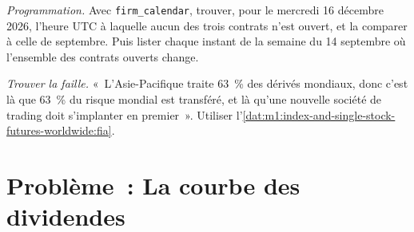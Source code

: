 \begin{exercise}[$\star\star\star$]\label{exo:m1:index-and-single-stock-futures-worldwide:7}
\emph{Programmation.} Avec \texttt{firm\_calendar}, trouver, pour le mercredi 16 décembre
2026, l'heure UTC à laquelle aucun des trois contrats n'est ouvert, et la comparer
à celle de septembre. Puis lister chaque instant de la semaine du 14 septembre où
l'ensemble des contrats ouverts change.
\end{exercise}

\begin{exercise}[$\star\star\star$]\label{exo:m1:index-and-single-stock-futures-worldwide:8}
\emph{Trouver la faille.} «~L'Asie-Pacifique traite 63~\% des dérivés mondiaux,
donc c'est là que 63~\% du risque mondial est transféré, et là qu'une nouvelle société de
trading doit s'implanter en premier~». Utiliser
l'\cref{dat:m1:index-and-single-stock-futures-worldwide:fia}.
\end{exercise}

\section{Problème~: La courbe des dividendes}

